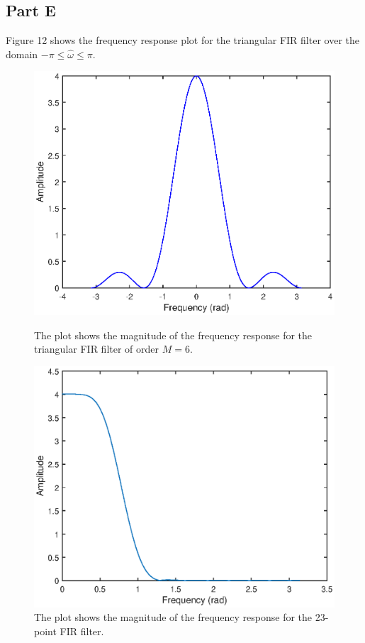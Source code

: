 \documentclass{article}
\begin{document}
\newpage

\subsection{Part E}
Figure 12 shows the frequency response plot for the triangular FIR filter over the domain $-\pi \leq \hat{\omega} \leq \pi $.

\begin{figure}[H]
	\begin{minipage}[t]{0.48\linewidth}
		\centering
		\includegraphics[scale=0.6]{fig12}
		\caption{The plot shows the magnitude of the frequency response for the triangular FIR filter of order $M=6$.}
	\end{minipage}
	\hspace{0.5cm}
	\begin{minipage}[t]{0.48\linewidth}
		\centering
		\includegraphics[scale=0.6]{fig14}
		\caption{The plot shows the magnitude of the frequency response for the 23-point FIR filter.}
	\end{minipage}
\end{figure}
\end{document}
